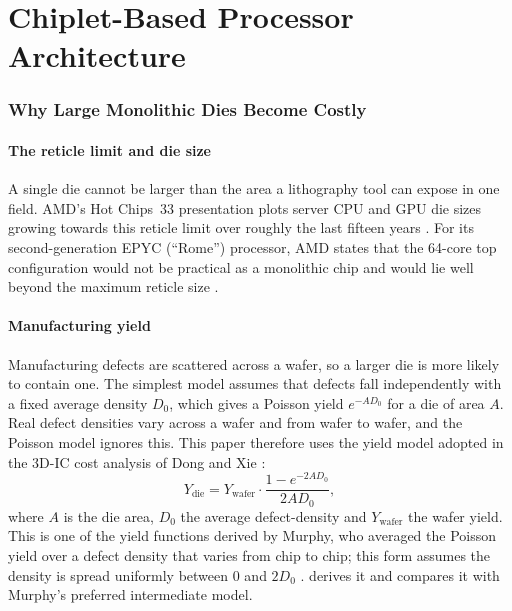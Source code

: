 \clearpage
\part{Chiplet-Based Processor Architecture}
\label{part:chiplets}

\section{Why Large Monolithic Dies Become Costly}
\label{sec:monolithic-limits}

\subsection{The reticle limit and die size}
A single die cannot be larger than the area a lithography tool can expose in one field. AMD's Hot Chips~33 presentation plots server CPU and GPU die sizes growing towards this reticle limit over roughly the last fifteen years \cite{swaminathanAdvancedPackagingEnabling2021}. For its second-generation EPYC (``Rome'') processor, AMD states that the 64-core top configuration would not be practical as a monolithic chip and would lie well beyond the maximum reticle size \cite{naffziger2020chiplet}.

\subsection{Manufacturing yield}
\label{sec:yield-cost}

Manufacturing defects are scattered across a wafer, so a larger die is more likely to contain one. The simplest model assumes that defects fall independently with a fixed average density $D_0$, which gives a Poisson yield $e^{-AD_0}$ for a die of area $A$. Real defect densities vary across a wafer and from wafer to wafer, and the Poisson model ignores this. This paper therefore uses the yield model adopted in the 3D-IC cost analysis of Dong and Xie \cite[Eq.~15]{dongSystemlevelCostAnalysis2009}:
\begin{equation}
  Y_{\mathrm{die}} = Y_{\mathrm{wafer}} \cdot \frac{1 - e^{-2 A D_0}}{2 A D_0},
  \label{eq:yield}
\end{equation}
where $A$ is the die area, $D_0$ the average \gls{defect-density} and $Y_{\mathrm{wafer}}$ the wafer yield. This is one of the yield functions derived by Murphy, who averaged the Poisson yield over a defect density that varies from chip to chip; this form assumes the density is spread uniformly between $0$ and $2D_0$ \cite[Eq.~11]{murphyCostsizeOptimaMonolithic1964}.  derives it and compares it with Murphy's preferred intermediate model.

